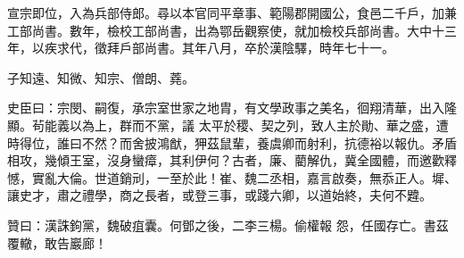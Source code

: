 \begin{pinyinscope}
 宣宗即位，入為兵部侍郎。尋以本官同平章事、範陽郡開國公，食邑二千戶，加兼工部尚書。數年，檢校工部尚書，出為鄂岳觀察使，就加檢校兵部尚書。大中十三年，以疾求代，徵拜戶部尚書。其年八月，卒於漢陰驛，時年七十一。



 子知遠、知微、知宗、僧朗、蕘。



 史臣曰：宗閔、嗣復，承宗室世家之地胄，有文學政事之美名，徊翔清華，出入隆顯。茍能義以為上，群而不黨，議
 太平於稷、契之列，致人主於勛、華之盛，遭時得位，誰曰不然？而舍披鴻猷，狎茲鼠輩，養虞卿而射利，抗德裕以報仇。矛盾相攻，幾傾王室，沒身蠻瘴，其利伊何？古者，廉、藺解仇，冀全國體，而邀歡釋憾，實亂大倫。世道銷刓，一至於此！崔、魏二丞相，嘉言啟奏，無忝正人。墀、讓史才，肅之禮學，商之長者，或登三事，或踐六卿，以道始終，夫何不韙。



 贊曰：漢誅鉤黨，魏破疽囊。何鄧之後，二李三楊。偷權報
 怨，任國存亡。書茲覆轍，敢告巖廊！



\end{pinyinscope}